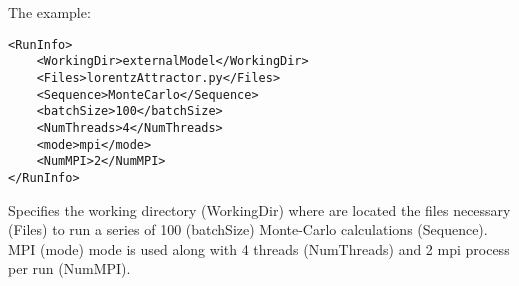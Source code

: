 
The example:
\begin{lstlisting}[style=XML]
<RunInfo>
    <WorkingDir>externalModel</WorkingDir>
    <Files>lorentzAttractor.py</Files>
    <Sequence>MonteCarlo</Sequence>
    <batchSize>100</batchSize>
    <NumThreads>4</NumThreads>    
    <mode>mpi</mode>
    <NumMPI>2</NumMPI>
</RunInfo>
\end{lstlisting}
Specifies the working directory (WorkingDir) where are located the files necessary (Files) to run a series of 100 (batchSize) Monte-Carlo calculations (Sequence).
MPI (mode) mode is used along with 4 threads (NumThreads) and 2 mpi process per run (NumMPI).
